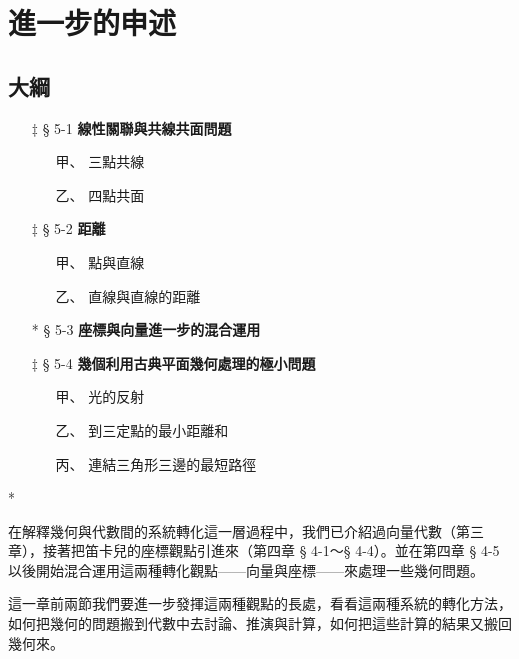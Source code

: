 \section{進一步的申述}
\label{sec:b3s_ch5}

\renewcommand{\thefigure}{5-\arabic{figure}}
\setcounter{figure}{0}

\subsection*{大綱}

\begin{itemize}[leftmargin=2em]
  \item[$\ddagger$ § 5-1] \textbf{線性關聯與共線共面問題}
  \begin{itemize}[leftmargin=2em]
    \item[甲、] 三點共線
    \item[乙、] 四點共面
  \end{itemize}
  \item[$\ddagger$ § 5-2] \textbf{距離}
  \begin{itemize}[leftmargin=2em]
    \item[甲、] 點與直線
    \item[乙、] 直線與直線的距離
  \end{itemize}
  \item[* § 5-3] \textbf{座標與向量進一步的混合運用}
  \item[$\ddagger$ § 5-4] \textbf{幾個利用古典平面幾何處理的極小問題}
  \begin{itemize}[leftmargin=2em]
    \item[甲、] 光的反射
    \item[乙、] 到三定點的最小距離和
    \item[丙、] 連結三角形三邊的最短路徑
  \end{itemize}
\end{itemize}

\begin{center}
* \qquad * \qquad * \qquad * \qquad *
\end{center}

在解釋幾何與代數間的系統轉化這一層過程中，我們已介紹過向量代數（第三章），接著把笛卡兒的座標觀點引進來（第四章 § 4-1～§ 4-4）。並在第四章 § 4-5 以後開始混合運用這兩種轉化觀點——向量與座標——來處理一些幾何問題。

這一章前兩節我們要進一步發揮這兩種觀點的長處，看看這兩種系統的轉化方法，如何把幾何的問題搬到代數中去討論、推演與計算，如何把這些計算的結果又搬回幾何來。

